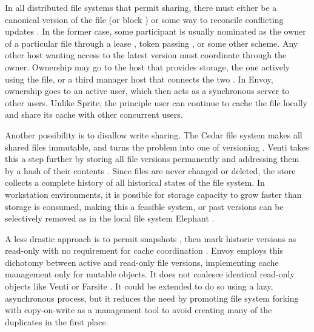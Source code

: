 In all distributed file systems that permit sharing, there must either be a canonical version of the file (or block \cite{mcgregor}) or some way to reconcile conflicting updates \cite{kistler}. In the former case, some participant is usually nominated as the owner of a particular file through a lease \cite{gray89}, token passing \cite{burrows,mann,kazar}, or some other scheme. Any other host wanting access to the latest version must coordinate through the owner. Ownership may go to the host that provides storage, the one actively using the file, or a third manager host that connects the two \cite{blaze,keleher}. In Envoy, ownership goes to an active user, which then acts as a synchronous server to other users. Unlike Sprite, the principle user can continue to cache the file locally and share its cache with other concurrent users.

Another possibility is to disallow write sharing. The Cedar file system \cite{schroeder} makes all shared files immutable, and turns the problem into one of versioning \cite{gifford}. Venti takes this a step further by storing all file versions permanently and addressing them by a hash of their contents \cite{quinlan}. Since files are never changed or deleted, the store collects a complete history of all historical states of the file system. In workstation environments, it is possible for storage capacity to grow faster than storage is consumed, making this a feasible system, or past versions can be selectively removed as in the local file system Elephant \cite{santry}.

A less drastic approach is to permit snapshots \cite{hitz}, then mark historic versions as read-only with no requirement for cache coordination \cite{warfield}. Envoy employs this dichotomy between active and read-only file versions, implementing cache management only for mutable objects. It does not coalesce identical read-only objects like Venti or Farsite \cite{douceur02}. It could be extended to do so using a lazy, asynchronous process, but it reduces the need by promoting file system forking with copy-on-write as a management tool to avoid creating many of the duplicates in the first place.

